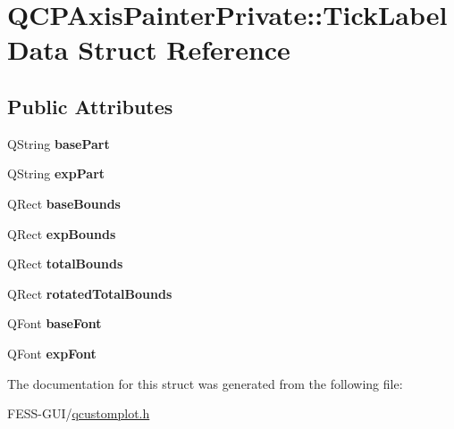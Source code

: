 \hypertarget{struct_q_c_p_axis_painter_private_1_1_tick_label_data}{}\section{Q\+C\+P\+Axis\+Painter\+Private\+:\+:Tick\+Label\+Data Struct Reference}
\label{struct_q_c_p_axis_painter_private_1_1_tick_label_data}
\subsection*{Public Attributes}
\begin{DoxyCompactItemize}
\item 
\hypertarget{struct_q_c_p_axis_painter_private_1_1_tick_label_data_ad65b76a5cafc412179a20b5d79809fc4}{}\label{struct_q_c_p_axis_painter_private_1_1_tick_label_data_ad65b76a5cafc412179a20b5d79809fc4} 
Q\+String {\bfseries base\+Part}
\item 
\hypertarget{struct_q_c_p_axis_painter_private_1_1_tick_label_data_a09692e4ea092137278b4ac051d5fdf2b}{}\label{struct_q_c_p_axis_painter_private_1_1_tick_label_data_a09692e4ea092137278b4ac051d5fdf2b} 
Q\+String {\bfseries exp\+Part}
\item 
\hypertarget{struct_q_c_p_axis_painter_private_1_1_tick_label_data_aac1047ae6ab8e9f5a42923082aabfff5}{}\label{struct_q_c_p_axis_painter_private_1_1_tick_label_data_aac1047ae6ab8e9f5a42923082aabfff5} 
Q\+Rect {\bfseries base\+Bounds}
\item 
\hypertarget{struct_q_c_p_axis_painter_private_1_1_tick_label_data_a6722d2bcefb93011e9dc42301b966846}{}\label{struct_q_c_p_axis_painter_private_1_1_tick_label_data_a6722d2bcefb93011e9dc42301b966846} 
Q\+Rect {\bfseries exp\+Bounds}
\item 
\hypertarget{struct_q_c_p_axis_painter_private_1_1_tick_label_data_afbb3163cf4c628914f1b703945419ea5}{}\label{struct_q_c_p_axis_painter_private_1_1_tick_label_data_afbb3163cf4c628914f1b703945419ea5} 
Q\+Rect {\bfseries total\+Bounds}
\item 
\hypertarget{struct_q_c_p_axis_painter_private_1_1_tick_label_data_aa4d38c5ea47c9184a78ee33ae7f1012e}{}\label{struct_q_c_p_axis_painter_private_1_1_tick_label_data_aa4d38c5ea47c9184a78ee33ae7f1012e} 
Q\+Rect {\bfseries rotated\+Total\+Bounds}
\item 
\hypertarget{struct_q_c_p_axis_painter_private_1_1_tick_label_data_a0d4958a706debaa8d19a9b65fc090d56}{}\label{struct_q_c_p_axis_painter_private_1_1_tick_label_data_a0d4958a706debaa8d19a9b65fc090d56} 
Q\+Font {\bfseries base\+Font}
\item 
\hypertarget{struct_q_c_p_axis_painter_private_1_1_tick_label_data_adc10767ebcb719d6927c012a38b9d933}{}\label{struct_q_c_p_axis_painter_private_1_1_tick_label_data_adc10767ebcb719d6927c012a38b9d933} 
Q\+Font {\bfseries exp\+Font}
\end{DoxyCompactItemize}


The documentation for this struct was generated from the following file\+:\begin{DoxyCompactItemize}
\item 
F\+E\+S\+S-\/\+G\+U\+I/\hyperlink{qcustomplot_8h}{qcustomplot.\+h}\end{DoxyCompactItemize}
